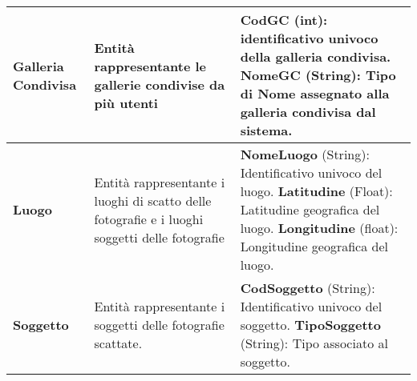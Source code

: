 \begin{xltabular}{\textwidth}{l X X}
        \textbf{Galleria Condivisa} & Entità rappresentante le gallerie condivise da più utenti & \textbf{CodGC} (int): identificativo univoco della galleria condivisa.
        \newline\textbf{NomeGC} (String): Tipo di Nome assegnato alla galleria condivisa dal sistema.\\
        \hline

        \textbf{Luogo} & Entità rappresentante i luoghi di scatto delle fotografie e i luoghi soggetti delle fotografie & \textbf{NomeLuogo} (String): Identificativo univoco del luogo. 
        \newline\textbf{Latitudine} (Float): Latitudine geografica del luogo. 
        \newline\textbf{Longitudine} (float): Longitudine geografica del luogo. \\
        \hline

        \textbf{Soggetto} & Entità rappresentante i soggetti delle fotografie scattate. & \textbf{CodSoggetto} (String): Identificativo univoco del soggetto.
        \newline\textbf{TipoSoggetto} (String): Tipo associato al soggetto. \\

    \end{xltabular}
\endgroup

\begingroup
        
